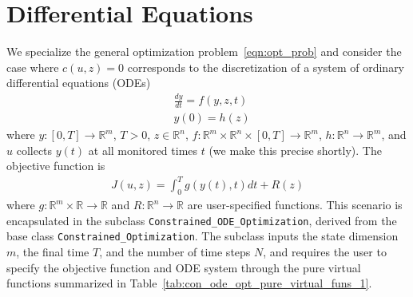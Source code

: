\documentclass{article}
\def\R{{\mathbb R}}
\begin{document}
\section*{Differential Equations}

We specialize the general optimization problem~\eqref{eqn:opt_prob} and consider the case where $c(u, z)=0$ corresponds to the discretization of a system of ordinary differential equations (ODEs)
\begin{align*}
&\frac{dy}{dt} = f(y,z,t) \\
&y(0) = h(z)
\end{align*}
where $y:[0,T] \to \R^m$, $T>0$, $z \in \R^n$, $f:\R^m \times \R^n \times [0,T]  \to \R^m$, $h:\R^n \to \R^m$, and $u$ collects $y(t)$ at all monitored times $t$ (we make this precise shortly).
The objective function is
\begin{align*}
J(u,z) = \int_0^{T} g(y(t),t) dt + R(z)
\end{align*}
where $g:\R^m \times \R \to \R$ and $R:\R^n \to \R$ are user-specified functions.
This scenario is encapsulated in the subclass \texttt{Constrained\_ODE\_Optimization}, derived from the base class \texttt{Constrained\_Optimization}.
The subclass inputs the state dimension $m$, the final time $T$, and the number of time steps $N$, and requires the user to specify the objective function and ODE system through the pure virtual functions summarized in Table~\ref{tab:con_ode_opt_pure_virtual_funs_1}.
\end{document}

